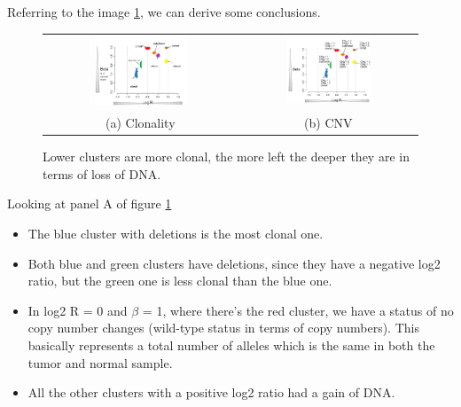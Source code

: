 Referring to the image \ref{fig:cluster0}, we can derive some conclusions.

\begin{figure}[H]
\begin{tabular}{cc}
  \includegraphics[width=0.5\textwidth]{image2.png} &   \includegraphics[width=0.5\textwidth]{image3.png} \\
(a) Clonality & (b) CNV \\[6pt]
\end{tabular}
\caption{Lower clusters are more clonal, the more left the deeper they are in terms of loss of DNA.}
\label{fig:cluster0}
\end{figure}

Looking at panel A of figure \ref{fig:cluster0}
\begin{itemize}
\item The blue cluster with deletions is the most clonal one.
\item Both blue and green clusters have deletions, since they have a negative log2 ratio, but the green one is less clonal than the blue one.
\item In log2 R = 0 and $\beta$ = 1, where there's the red cluster, we have a status of no copy number changes (wild-type status in terms of copy numbers). This basically represents a total number of alleles which is the same in both the tumor and normal sample.
\item All the other clusters with a positive log2 ratio had a gain of DNA.
\end{itemize}

